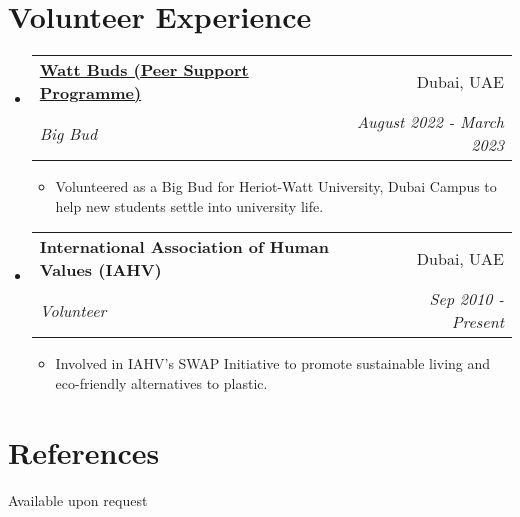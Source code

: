 \documentclass[a4paper,20pt]{article}
\makeatletter
\newcommand{\resumeItemWithoutTitle}[1]{
  \item\small{
	{#1 \vspace{-2pt}}
  }
}
\newcommand{\resumeSubheading}[4]{
  \vspace{-1pt}\item
	\begin{tabular*}{0.97\textwidth}{l@{\extracolsep{\fill}}r}
	  \textbf{#1} & #2 \\
	  \textit{#3} & \textit{#4} \\
	\end{tabular*}\vspace{-5pt}
}
\newcommand{\resumeSubHeadingListStart}{\begin{itemize}[leftmargin=*]}
\newcommand{\resumeSubHeadingListEnd}{\end{itemize}}
\newcommand{\resumeItemListStart}{\begin{itemize}}
\newcommand{\resumeItemListEnd}{\end{itemize}\vspace{-5pt}}
\makeatother
\begin{document}
\section{Volunteer Experience}
	\resumeSubHeadingListStart
		\resumeSubheading{\href{https://www.hw.ac.uk/uk/students/studies/wattbuds-dubai.htm}{Watt Buds (Peer Support Programme)}}{Dubai, UAE}
		{Big Bud}{August 2022 - March 2023}
			\resumeItemListStart
				\resumeItemWithoutTitle{Volunteered as a Big Bud for Heriot-Watt University, Dubai Campus to help new students settle into university life.}
			\resumeItemListEnd
		\resumeSubheading{International Association of Human Values (IAHV)}{Dubai, UAE}
		{Volunteer}{Sep 2010 - Present}
			\resumeItemListStart
				\resumeItemWithoutTitle{Involved in IAHV's SWAP Initiative to promote sustainable living and eco-friendly alternatives to plastic.}
			\resumeItemListEnd

\vspace{5pt}

	\resumeSubHeadingListEnd

\vspace{-5pt}
\section{References}
Available upon request
\end{document}
